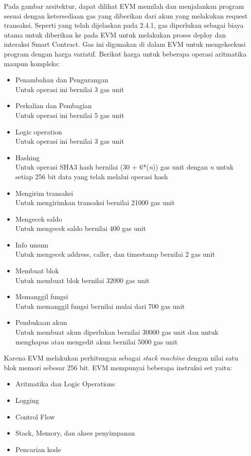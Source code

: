 Pada gambar arsitektur, dapat dilihat EVM memilah dan menjalankan program sesuai dengan ketersediaan gas yang diberikan dari akun yang melakukan request transaksi. Seperti yang telah dijelaskan pada 2.4.1, gas diperlukan sebagai biaya utama untuk diberikan ke pada EVM untuk melakukan proses deploy dan interaksi Smart Contract. Gas ini digunakan di dalam EVM untuk mengeksekusi program dengan harga variatif. Berikut harga untuk beberapa operasi aritmatika maupun kompleks:
\begin{itemize}
\item{Penambahan dan Pengurangan}\\Untuk operasi ini bernilai 3 gas unit
\item{Perkalian dan Pembagian}\\Untuk operasi ini bernilai 5 gas unit
\item{Logic operation}\\Untuk operasi ini bernilai 3 gas unit
\item{Hashing}\\Untuk operasi SHA3 hash bernilai (30 + 6*(\emph{n})) gas unit dengan \emph{n} untuk setiap 256 bit data yang telah melalui operasi hash
\item{Mengirim transaksi}\\Untuk mengirimkan transaksi bernilai 21000 gas unit
\item{Mengecek saldo}\\Untuk mengecek saldo bernilai 400 gas unit
\item{Info umum}\\Untuk mengecek address, caller, dan timestamp bernilai 2 gas unit
\item{Membuat blok}\\Untuk membuat blok bernilai 32000 gas unit
\item{Memanggil fungsi}\\Untuk memanggil fungsi bernilai mulai dari 700 gas unit
\item{Pembukaan akun}\\Untuk membuat akun diperlukan bernilai 30000 gas unit dan untuk menghapus atau mengedit akun bernilai 5000 gas unit 
\end{itemize}
Karena EVM melakukan perhitungan sebagai \emph{stack machine} dengan nilai satu blok memori sebesar 256 bit. EVM mempunyai beberapa instruksi set yaitu:
\begin{itemize}
\item{Aritmatika dan Logic Operations}
\item{Logging}
\item{Control Flow}
\item{Stack, Memory, dan akses penyimpanan}
\item{Pencarian kode}
\end{itemize}

